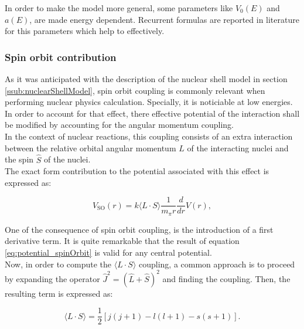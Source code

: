 \documentclass[openany]{book}
\begin{document}
In order to make the model more general, some parameters like $V_0(E)$ and $a(E)$, are made energy dependent. Recurrent formulas are reported in literature for this parameters which help to effectively.

\subsubsection{Spin orbit contribution} \label{sub:potential_effective_spinOrbit}

As it was anticipated with the description of the nuclear shell model in section \ref{ssub:nuclearShellModel}, spin orbit coupling is commonly relevant when performing nuclear physics calculation. Specially, it is noticiable at low energies. \\

In order to account for that effect, there effective potential of the interaction shall be modified by accounting for the angular momentum coupling. \\

 In the context of nuclear reactions, this coupling consists of an extra interaction between the relative orbital angular momentum $\hat L$ of the interacting nuclei and the spin $\hat S$ of the nuclei. \\

The exact form contribution to the potential associated with this effect is expressed as:

\begin{equation}  \label{eq:potential_spinOrbit}
	V_{\mathrm{SO}}(r) = k\langle L \cdot S \rangle  \frac{1}{m_{\pi}r} \frac{d}{dr} V(r),
\end{equation}

One of the consequence of spin orbit coupling, is the introduction of a first derivative term. It is quite remarkable that the result of equation \ref{eq:potential_spinOrbit} is valid for any central potential.  \\

Now, in order to compute the   $  \langle L \cdot S \rangle$ coupling, a common approach is to proceed by expanding the operator  $\hat J^2 = (\hat L + \hat S)^2$ and finding the coupling. Then, the resulting term is expressed as: 

\begin{equation}  \label{eq:potential_spinOrbit_LSexpansion}
	\langle L \cdot S \rangle =  \frac{1}{2}[j(j+1) - l(l+1) - s(s+1)].
\end{equation}
\end{document}
